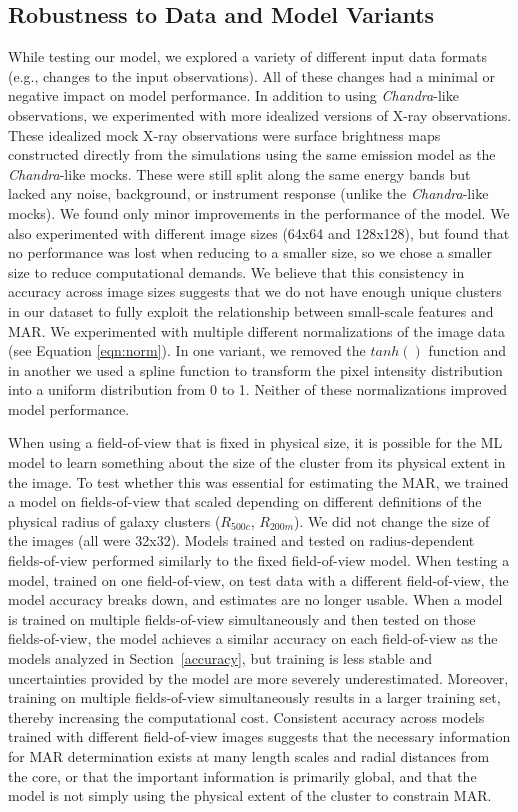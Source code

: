 \documentclass[twocolumn, linenumbers, 11pt]{aastex63}%
\begin{document}
\subsection{Robustness to Data and Model Variants}\label{data_robustness}
While testing our model, we explored a variety of different input data formats (e.g., changes to the input observations). All of these changes had a minimal or negative impact on model performance. In addition to using \textit{Chandra}-like observations, we experimented with more idealized versions of X-ray observations. These idealized mock X-ray observations were surface brightness maps constructed directly from the simulations using the same emission model as the {\it Chandra}-like mocks. These were still split along the same energy bands but lacked any noise, background, or instrument response (unlike the \textit{Chandra}-like mocks). We found only minor improvements in the performance of the model. We also experimented with different image sizes (64x64 and 128x128), but found that no performance was lost when reducing to a smaller size, so we chose a smaller size to reduce computational demands. We believe that this consistency in accuracy across image sizes suggests that we do not have enough unique clusters in our dataset to fully exploit the relationship between small-scale features and MAR. We experimented with multiple different normalizations of the image data (see Equation \ref{eqn:norm}). In one variant, we removed the $tanh()$ function and in another we used a spline function to transform the pixel intensity distribution into a uniform distribution from 0 to 1. Neither of these normalizations improved model performance. 

When using a field-of-view that is fixed in physical size, it is possible for the ML model to learn something about the size of the cluster from its physical extent in the image. To test whether this was essential for estimating the MAR, we trained a model on fields-of-view that scaled depending on different definitions of the physical radius of galaxy clusters ($R_{500c}$, $R_{200m}$). We did not change the size of the images (all were 32x32). Models trained and tested on radius-dependent fields-of-view performed similarly to the fixed field-of-view model. When testing a model, trained on one field-of-view, on test data with a different field-of-view, the model accuracy breaks down, and estimates are no longer usable. When a model is trained on multiple fields-of-view simultaneously and then tested on those fields-of-view, the model achieves a similar accuracy on each field-of-view as the models analyzed in Section~\ref{accuracy}, but training is less stable and uncertainties provided by the model are more severely underestimated. Moreover, training on multiple fields-of-view simultaneously results in a larger training set, thereby increasing the computational cost. Consistent accuracy across models trained with different field-of-view images suggests that the necessary information for MAR determination exists at many length scales and radial distances from the core, or that the important information is primarily global, and that the model is not simply using the physical extent of the cluster to constrain MAR.
\end{document}
